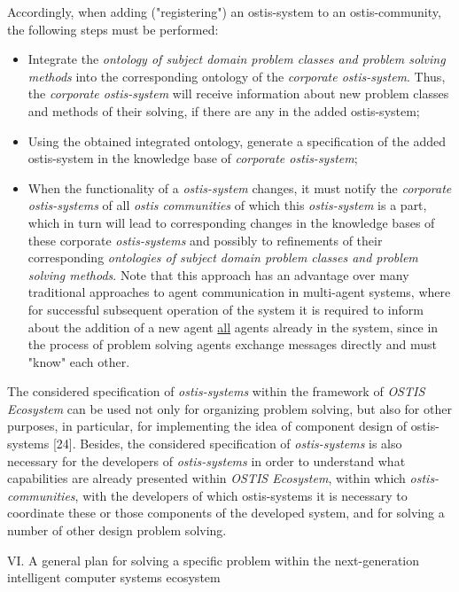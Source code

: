 \documentclass[9pt, letterpaper]{article}
\begin{document}
\begin{spacing}{0.97}
\begin{multicols}
Accordingly, when adding ("registering") an ostis-system to an ostis-community, the following steps must
be performed:

\begin{itemize}
    \item Integrate the \textit{ontology of subject domain problem
classes and problem solving methods} into the corresponding ontology of the \textit{corporate ostis-system}.
Thus, the \textit{corporate ostis-system} will receive information about new problem classes and methods of
their solving, if there are any in the added ostis-system;
    \item Using the obtained integrated ontology, generate
a specification of the added ostis-system in the
knowledge base of \textit{corporate ostis-system};

    \item When the functionality of a \textit{ostis-system} changes, it
must notify the \textit{corporate ostis-systems} of all \textit{ostis
communities} of which this \textit{ostis-system} is a part,
which in turn will lead to corresponding changes in
the knowledge bases of these corporate \textit{ostis-systems}
and possibly to refinements of their corresponding
\textit{ontologies of subject domain problem classes and
problem solving methods}. Note that this approach
has an advantage over many traditional approaches
to agent communication in multi-agent systems,
where for successful subsequent operation of the
system it is required to inform about the addition of
a new agent \underline{all} agents already in the system, since
in the process of problem solving agents exchange
messages directly and must "know" each other.
\end{itemize}

The considered specification of \textit{ostis-systems} within
the framework of \textit{OSTIS Ecosystem} can be used not
only for organizing problem solving, but also for other
purposes, in particular, for implementing the idea of
component design of ostis-systems [24]. Besides, the
considered specification of \textit{ostis-systems} is also necessary
for the developers of \textit{ostis-systems} in order to understand
what capabilities are already presented within \textit{OSTIS
Ecosystem}, within which \textit{ostis-communities}, with the
developers of which ostis-systems it is necessary to
coordinate these or those components of the developed
system, and for solving a number of other design problem
solving.

\begin{center}
VI. A general plan for solving a specific problem
within the next-generation intelligent computer systems
ecosystem
\end{center}


\end{multicols}
\end{spacing}
\end{document}
